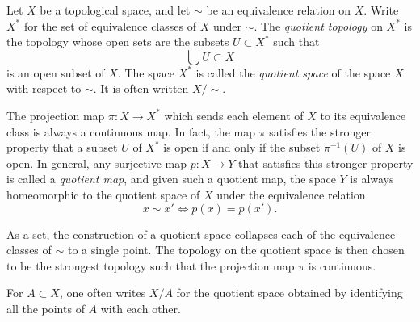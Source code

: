 \documentclass[12pt]{article}
\begin{document}
Let $X$ be a topological space, and let $\sim$ be an equivalence relation on $X$. Write $X^*$ for the set of equivalence classes of $X$ under $\sim$. The {\em quotient topology} on $X^*$ is the topology whose open sets are the subsets $U \subset X^*$ such that
$$
\bigcup U \subset X
$$
is an open subset of $X$. The space $X^*$ is called the {\em quotient space} of the space $X$ with respect to $\sim$. It is often written $X/\sim$.

The projection map $\pi: X \longrightarrow X^*$ which sends each element of $X$ to its equivalence class is always a continuous map. In fact, the map $\pi$ satisfies the stronger property that a subset $U$ of $X^*$ is open if and only if the subset $\pi^{-1}(U)$ of $X$ is open. In general, any surjective map $p: X \longrightarrow Y$ that satisfies this stronger property is called a {\em quotient map}, and given such a quotient map, the space $Y$ is always homeomorphic to the quotient space of $X$ under the equivalence relation
$$
x \sim x' \iff p(x) = p(x').
$$

As a set, the construction of a quotient space collapses each of the equivalence classes of $\sim$ to a single point. The topology on the quotient space is then chosen to be the strongest topology such that the projection map $\pi$ is continuous.

For $A \subset X$, one often writes $X/A$ for the quotient space obtained by identifying all the points of $A$ with each other.
\end{document}
